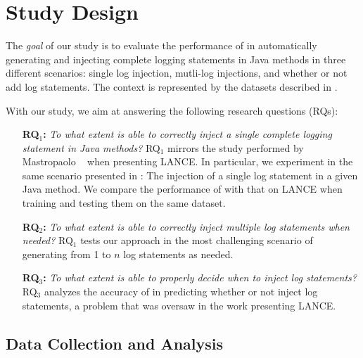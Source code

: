 \section{Study Design} \label{sec:design}

The \emph{goal} of our study is to evaluate the performance of \approach in automatically generating and injecting complete logging statements in Java methods in three different scenarios: single log injection, mutli-log injections, and whether or not add log statements. The context is represented by the datasets described in .

With our study, we aim at answering the following research questions (RQs):
\begin{itemize}

\item[\textbf{RQ$_1$:}]\textit{To what extent is \approach able to correctly inject a single complete logging statement in Java methods?} RQ$_1$ mirrors the study performed by Mastropaolo \etal~\cite{mastropaolo2022using} when presenting LANCE. In particular, we experiment \approach in the same scenario presented in \cite{mastropaolo2022using}: The injection of a single log statement in a given Java method. We compare the performance of \approach with that on LANCE when training and testing them on the same dataset. 
\smallskip

\item[\textbf{RQ$_2$:}]\textit{To what extent is \approach able to correctly inject multiple log statements when needed?} RQ$_1$ tests our approach in the most challenging scenario of generating from 1 to $n$ log statements as needed.

\item[\textbf{RQ$_3$:}]\textit{To what extent is \approach able to properly decide when to inject log statements?} RQ$_3$ analyzes the accuracy of \approach in predicting whether or not inject log statements, a problem that was oversaw in the work presenting LANCE.

\end{itemize}

\subsection{Data Collection and Analysis}

